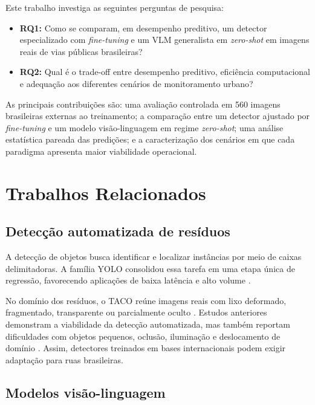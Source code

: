 \documentclass[kdmile,a4paper]{kdmile}
\begin{document}
Este trabalho investiga as seguintes perguntas de pesquisa:
\begin{itemize}
    \setlength{\itemsep}{0pt}
    \setlength{\parsep}{0pt}
    \setlength{\topsep}{2pt}
    \item \textbf{RQ1:} Como se comparam, em desempenho preditivo, um detector especializado com \emph{fine-tuning} e um VLM generalista em \emph{zero-shot} em imagens reais de vias públicas brasileiras?
    \item \textbf{RQ2:} Qual é o trade-off entre desempenho preditivo, eficiência computacional e adequação aos diferentes cenários de monitoramento urbano?
\end{itemize}

As principais contribuições são: uma avaliação controlada em 560 imagens brasileiras externas ao treinamento; a comparação entre um detector ajustado por \emph{fine-tuning} e um modelo visão-linguagem em regime \emph{zero-shot}; uma análise estatística pareada das predições; e a caracterização dos cenários em que cada paradigma apresenta maior viabilidade operacional.

\section{Trabalhos Relacionados}
\label{sec:trabalhos-relacionados}

\subsection{Detecção automatizada de resíduos}
\label{sec:deteccao-residuos}

A detecção de objetos busca identificar e localizar instâncias por meio de caixas delimitadoras. A família YOLO consolidou essa tarefa em uma etapa única de regressão, favorecendo aplicações de baixa latência e alto volume \cite{Redmon2016,Terven2023,Khanam2024}.

No domínio dos resíduos, o TACO reúne imagens reais com lixo deformado, fragmentado, transparente ou parcialmente oculto \cite{Proenca2020}. Estudos anteriores demonstram a viabilidade da detecção automatizada, mas também reportam dificuldades com objetos pequenos, oclusão, iluminação e deslocamento de domínio \cite{Majchrowska2022,Cordova2022}. Assim, detectores treinados em bases internacionais podem exigir adaptação para ruas brasileiras.

\subsection{Modelos visão-linguagem}
\label{sec:modelos-visao-linguagem}
\end{document}

